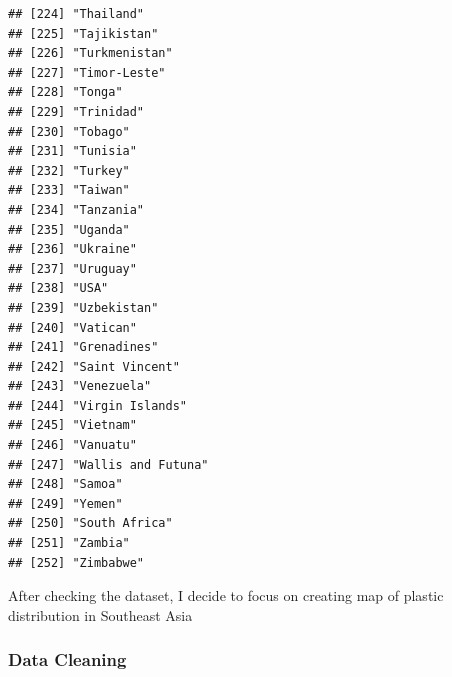 \documentclass[
]{article}
\begin{document}
\begin{verbatim}
## [224] "Thailand"                           
## [225] "Tajikistan"                         
## [226] "Turkmenistan"                       
## [227] "Timor-Leste"                        
## [228] "Tonga"                              
## [229] "Trinidad"                           
## [230] "Tobago"                             
## [231] "Tunisia"                            
## [232] "Turkey"                             
## [233] "Taiwan"                             
## [234] "Tanzania"                           
## [235] "Uganda"                             
## [236] "Ukraine"                            
## [237] "Uruguay"                            
## [238] "USA"                                
## [239] "Uzbekistan"                         
## [240] "Vatican"                            
## [241] "Grenadines"                         
## [242] "Saint Vincent"                      
## [243] "Venezuela"                          
## [244] "Virgin Islands"                     
## [245] "Vietnam"                            
## [246] "Vanuatu"                            
## [247] "Wallis and Futuna"                  
## [248] "Samoa"                              
## [249] "Yemen"                              
## [250] "South Africa"                       
## [251] "Zambia"                             
## [252] "Zimbabwe"
\end{verbatim}

After checking the dataset, I decide to focus on creating map of plastic
distribution in Southeast Asia

\hypertarget{data-cleaning}{%
\subsubsection{Data Cleaning}\label{data-cleaning}}
\end{document}
